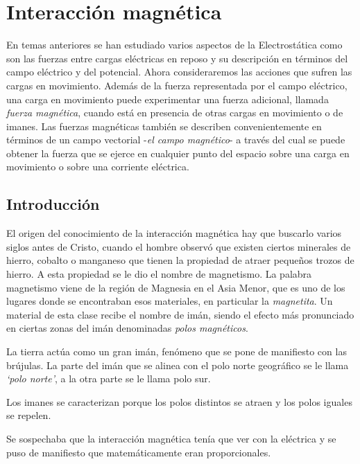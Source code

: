 \chapter{Interacción magnética}

\begin{miparrafo}
En temas anteriores se han estudiado varios aspectos de la Electrostática como son las fuerzas entre cargas eléctricas en reposo y su descripción en términos del campo eléctrico y del potencial. Ahora consideraremos las acciones que sufren las cargas en movimiento. Además de la fuerza representada por el campo eléctrico, una carga en movimiento puede experimentar una fuerza adicional, llamada \emph{fuerza magnética}, cuando está en presencia de otras cargas en movimiento o de imanes. Las fuerzas magnéticas también se describen convenientemente en términos de un campo vectorial -\emph{el campo magnético}- a través del cual se puede obtener la fuerza que se ejerce en cualquier punto del espacio sobre una carga en movimiento o sobre una corriente eléctrica.
\end{miparrafo}

\section{Introducción}

El origen del conocimiento de la interacción magnética hay que buscarlo varios siglos antes de Cristo, cuando el hombre observó que existen ciertos minerales de hierro, cobalto o manganeso que tienen la propiedad de atraer pequeños trozos de hierro. A esta propiedad se le dio el nombre de magnetismo. La palabra magnetismo viene de la región de Magnesia en el Asia Menor, que es uno de los lugares donde se encontraban esos materiales, en particular la \emph{magnetita}. Un material de esta clase recibe el nombre de imán, siendo el efecto más pronunciado en ciertas zonas del imán denominadas \emph{polos magnéticos}. 

La tierra actúa como un gran imán, fenómeno que se pone de manifiesto con las brújulas. La parte del imán que se alinea con el polo norte geográfico se le llama \emph{`polo norte'}, a la otra parte se le llama polo sur.

Los imanes se caracterizan porque los polos distintos se atraen y los polos iguales se repelen.

Se sospechaba que la interacción magnética tenía que ver con la eléctrica y se puso de manifiesto que matemáticamente eran proporcionales.

